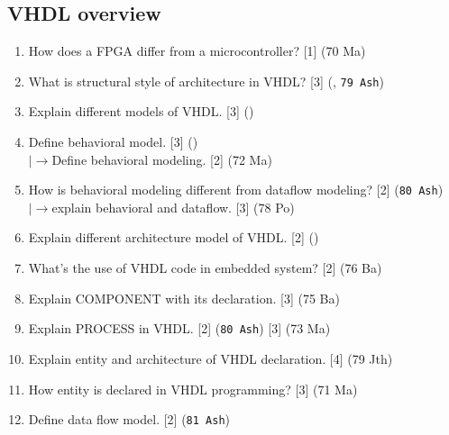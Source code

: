 \documentclass[12pt]{article}
\newcommand{\lb}{\\$\left|\rightarrow\right.$}
\begin{document}
  \subsection{VHDL overview}
    \begin{enumerate}
      \item How does a FPGA differ from a microcontroller? \hfill [1] (70 Ma)

      \item What is structural style of architecture in VHDL? \hfill [3] (, \texttt{79 Ash})

      \item Explain different models of VHDL. \hfill [3] ()

      \item Define behavioral model. \hfill [3] ()
      \lb Define behavioral modeling. \hfill [2] (72 Ma)

      \item How is behavioral modeling different from dataflow modeling? \hfill [2] (\texttt{80 Ash})
        \lb explain behavioral and dataflow. \hfill [3] (78 Po)

      \item Explain different architecture model of VHDL. \hfill [2] ()

      \item What's the use of VHDL code in embedded system? \hfill [2] (76 Ba)

      \item Explain COMPONENT with its declaration. \hfill [3] (75 Ba)

      \item Explain PROCESS in VHDL. \hfill [2] (\texttt{80 Ash}) [3] (73 Ma)

      \item Explain entity and architecture of VHDL declaration. \hfill [4] (79 Jth)

      \item How entity is declared in VHDL programming? \hfill [3] (71 Ma)

      \item Define data flow model. \hfill [2] (\texttt{81 Ash})
    \end{enumerate}
\end{document}
